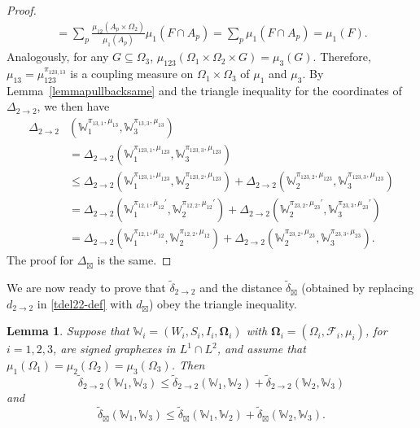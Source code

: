 \documentclass{amsart}
\numberwithin{equation}{section}
\numberwithin{figure}{section}
\newtheorem{lemma}[theorem]{Lemma}
\theoremstyle{definition}
\theoremstyle{remark}
\newcommand{\jbl}{{\boxtimes}}
\newcommand{\bOmega}{{\mathbf{\Omega}}}
\newcommand{\cW}{\mathbb{W}}
\newcommand{\cF}{\mathcal{F}}
\def\d22{d_{2\to 2}}
\def\tdel22{{\widetilde{\delta}}_{2\to 2}}
\def\djbl{d_{\jbl}}
\def\tdeljbl{\widetilde\delta_{\jbl}}
\begin{document}
\begin{proof}
\begin{align*}
=\sum_{p}\frac{\mu_{12}(A_p \times \Omega_2)}{\mu_1(A_p)} \mu_1(F \cap A_p)
=
\sum_{p} \mu_1(F \cap A_p)=\mu_1(F).
\end{align*}
Analogously, for any $G \subseteq \Omega_3$, $\mu_{123}(\Omega_1 \times
\Omega_2 \times G)=\mu_3(G)$. Therefore, $\mu_{13}=\mu_{123}^{\pi_{123,13}}$
is a coupling measure on $\Omega_1 \times \Omega_3$ of $\mu_1$ and $\mu_3$.
By Lemma~\ref{lemmapullbacksame} and the triangle inequality for the
coordinates of $\Delta_{2\to 2}$, we then have
\begin{align*}
\Delta_{2\to 2}&(\cW_1^{\pi_{13,1},\mu_{13}},\cW_3^{\pi_{13,3},\mu_{13}})\\
&=\Delta_{2\to 2}(\cW_1^{\pi_{123,1},\mu_{123}},\cW_3^{\pi_{123,3},\mu_{123}}) \\
&\le \Delta_{2\to 2}(\cW_1^{\pi_{123,1},\mu_{123}},\cW_2^{\pi_{123,2},\mu_{123}})
+\Delta_{2\to 2}(\cW_2^{\pi_{123,2},\mu_{123}},\cW_3^{\pi_{123,3},\mu_{123}})\\
&=
\Delta_{2\to 2}(\cW_1^{\pi_{12,1},\mu_{12}'},\cW_2^{\pi_{12,2},\mu_{12}'})
+\Delta_{2\to 2}(\cW_2^{\pi_{23,2},\mu_{23}'},\cW_3^{\pi_{23,3},\mu_{23}'})\\
&=\Delta_{2\to 2}(\cW_1^{\pi_{12,1},\mu_{12}},\cW_2^{\pi_{12,2},\mu_{12}})
+\Delta_{2\to 2}(\cW_2^{\pi_{23,2},\mu_{23}},\cW_3^{\pi_{23,3},\mu_{23}}).
\end{align*}
The proof for $\Delta_{\jbl}$ is the same.
\end{proof}

We are now ready to prove that $\tdel22$ and the distance
$\tdeljbl$ (obtained by replacing $\d22$ in \eqref{tdel22-def} with $\djbl$)
obey the triangle inequality.

\begin{lemma} \label{lemmacouplingsequence}
Suppose that $\cW_i=(W_i,S_i,I_i,\bOmega_i)$ with
$\bOmega_i=(\Omega_i,\cF_i,\mu_i)$, for $i=1,2,3$, are signed graphexes in
$L^1\cap L^2$, and assume that
 $\mu_1(\Omega_1)=\mu_2(\Omega_2)=\mu_3(\Omega_3)$. Then
\[
\tdel22(\cW_1,\cW_3)\leq\tdel22(\cW_1,\cW_2) + \tdel22(\cW_2,\cW_3)
\]
and
\[
\tdeljbl(\cW_1,\cW_3)\leq\tdeljbl(\cW_1,\cW_2) + \tdeljbl(\cW_2,\cW_3).
\]
\end{lemma}
\end{document}
